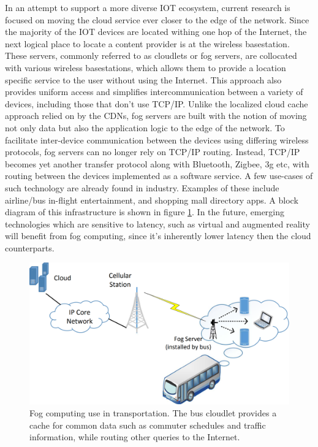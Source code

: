 In an attempt to support a more diverse IOT ecosystem, current research is focused on moving the cloud service ever closer to the edge of the network. Since the majority of the IOT devices are located withing one hop of the Internet, the next logical place to locate a content provider is at the wireless basestation.\cite{satyanarayanan2017emergence} These servers, commonly referred to as cloudlets or fog servers, are collocated with various wireless basestations, which allows them to provide a location specific service to the user without using the Internet. This approach also provides uniform access and simplifies intercommunication between a variety of devices, including those that don't use TCP/IP. Unlike the localized cloud cache approach relied on by the CDNs, fog servers are built with the notion of moving not only data but also the application logic to the edge of the network. To facilitate inter-device communication between the devices using differing wireless protocols, fog servers can no longer rely on TCP/IP routing. Instead, TCP/IP becomes yet another transfer protocol along with Bluetooth, Zigbee, 3g etc, with routing between the devices implemented as a software service.\cite{edgeiot} A few use-cases of such technology are already found in industry. Examples of these include airline/bus in-flight entertainment, and shopping mall directory apps. A block diagram of this infrastructure is shown in figure \ref{lit:fig:3}. In the future, emerging technologies which are sensitive to latency, such as virtual and augmented reality will benefit from fog computing, since it's inherently lower latency then the cloud counterparts.

\begin{figure}[h]
	\centering
	\includegraphics[width=0.6\linewidth]{img/fog_comp.png}	
	\caption{Fog computing use in transportation. The bus cloudlet provides a cache for common data such as commuter schedules and traffic information, while routing other queries to the Internet.\cite{edgeiot}}
	\label{lit:fig:3}
\end{figure}

